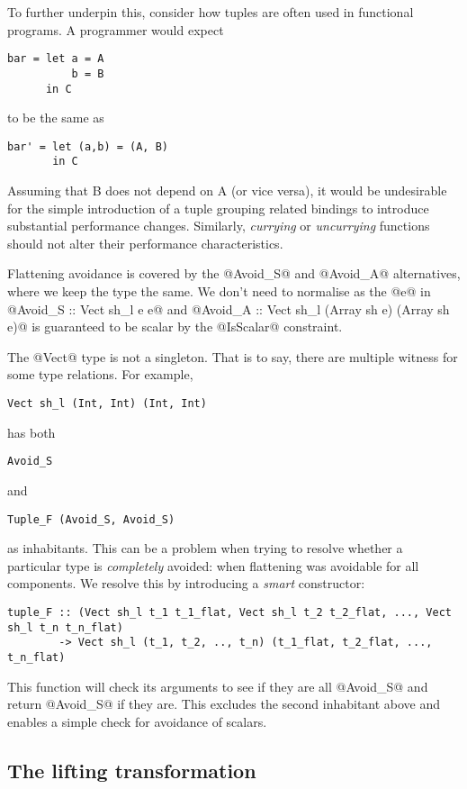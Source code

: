 To further underpin this, consider how tuples are often used in functional programs. A programmer would expect
%
\begin{lstlisting}[style=ndp]
bar = let a = A
          b = B
      in C
\end{lstlisting}
%
to be the same as
%
\begin{lstlisting}[style=ndp]
bar' = let (a,b) = (A, B)
       in C
\end{lstlisting}
%
Assuming that B does not depend on A (or vice versa), it would be undesirable for the simple introduction of a tuple grouping related bindings to introduce substantial performance changes. Similarly, \emph{currying} or \emph{uncurrying} functions should not alter their performance characteristics.

Flattening avoidance is covered by the @Avoid_S@ and @Avoid_A@ alternatives, where we keep the type the same. We don't need to normalise as the @e@ in @Avoid_S :: Vect sh_l e e@ and @Avoid_A :: Vect sh_l (Array sh e) (Array sh e)@ is guaranteed to be scalar by the @IsScalar@ constraint.

The @Vect@ type is not a singleton. That is to say, there are multiple witness for some type relations. For example,
%
\begin{lstlisting}[style=ndp]
Vect sh_l (Int, Int) (Int, Int)
\end{lstlisting}
%
has both
%
\begin{lstlisting}[style=ndp]
Avoid_S
\end{lstlisting}
%
and
%
\begin{lstlisting}[style=ndp]
Tuple_F (Avoid_S, Avoid_S)
\end{lstlisting}
%
as inhabitants. This can be a problem when trying to resolve whether a particular type is \emph{completely} avoided: when flattening was avoidable for all components. We resolve this by introducing a \emph{smart} constructor:
%
\begin{lstlisting}[style=ndp]
tuple_F :: (Vect sh_l t_1 t_1_flat, Vect sh_l t_2 t_2_flat, ..., Vect sh_l t_n t_n_flat)
        -> Vect sh_l (t_1, t_2, .., t_n) (t_1_flat, t_2_flat, ..., t_n_flat)
\end{lstlisting}

This function will check its arguments to see if they are all @Avoid_S@ and return @Avoid_S@ if they are. This excludes the second inhabitant above and enables a simple check for avoidance of scalars.

\subsection{The lifting transformation}

